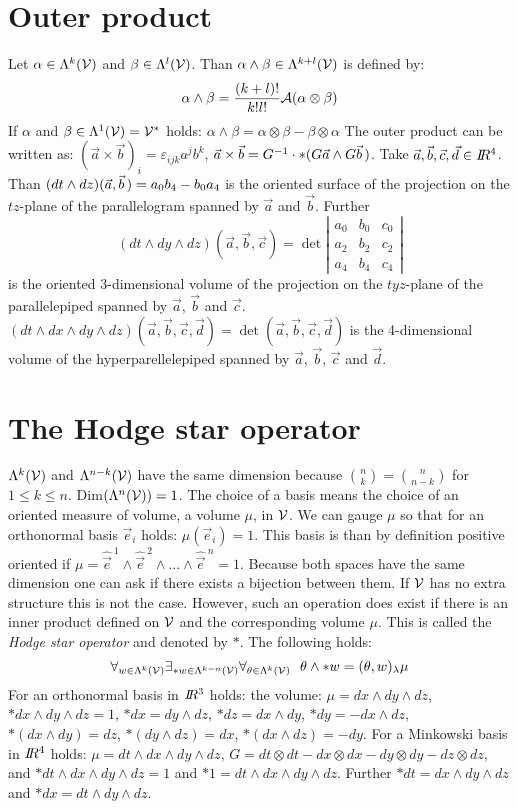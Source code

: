 \documentclass[a4paper,fancyheadings,twoside]{report}
\begin{document}
\section{Outer product}
Let $\alpha\in\Lambda^k(\cal V)$ and $\beta\in\Lambda^l(\cal V)$. Than
$\alpha\wedge\beta\in\Lambda^{k+l}(\cal V)$ is defined by:
\[
\alpha\wedge\beta=\frac{(k+l)!}{k!l!}{\cal A}(\alpha\otimes\beta)
\]
If $\alpha$ and $\beta\in\Lambda^1(\cal V)={\cal V}^*$ holds:
$\alpha\wedge\beta=\alpha\otimes\beta-\beta\otimes\alpha$
\npar
The outer product can be written as: $(\vec{a}\times\vec{b})_i=\varepsilon_{ijk}a^jb^k$,
$\vec{a}\times\vec{b}=G^{-1}\cdot*(G\vec{a}\wedge G\vec{b}\,)$.
\npar
Take $\vec{a},\vec{b},\vec{c},\vec{d}\in I\hspace{-1mm}R^4$. Than
$(dt\wedge dz)(\vec{a},\vec{b}\,)=a_0b_4-b_0a_4$ is the oriented surface of the
projection on the $tz$-plane of the parallelogram spanned by $\vec{a}$ and
$\vec{b}$.
\npar
Further
\[
(dt\wedge dy\wedge dz)(\vec{a},\vec{b},\vec{c})=\det\left|\begin{array}{ccc}
a_0&b_0&c_0\\ a_2&b_2&c_2\\ a_4&b_4&c_4 \end{array}\right|
\]
is the oriented 3-dimensional volume of the projection on the $tyz$-plane of
the parallelepiped spanned by $\vec{a}$, $\vec{b}$ and $\vec{c}$.
\npar
$(dt\wedge dx\wedge dy\wedge dz)(\vec{a},\vec{b},\vec{c},\vec{d})=\det(\vec{a},\vec{b},\vec{c},\vec{d})$
is the 4-dimensional volume of the hyperparellelepiped spanned by
$\vec{a}$, $\vec{b}$, $\vec{c}$ and $\vec{d}$.

\section{The Hodge star operator}
$\Lambda^k(\cal V)$ and $\Lambda^{n-k}(\cal V)$ have the same dimension
because ${n\choose k}={n\choose{n-k}}$ for $1\leq k\leq n$.
Dim$(\Lambda^n({\cal V}))=1$. The choice of a basis means the choice of an oriented
measure of volume, a volume $\mu$, in $\cal V$. We can gauge $\mu$ so that for
an orthonormal basis $\vec{e}_i$ holds: $\mu(\vec{e}_i)=1$. This basis is than
by definition positive oriented if
$\mu=\hat{\vec{e}}^{~1}\wedge \hat{\vec{e}}^{~2}\wedge...\wedge \hat{\vec{e}}^{~n}=1$.
\npar
Because both spaces have the same dimension one can ask if there exists a
bijection between them. If $\cal V$ has no extra structure this is not the
case. However, such an operation does exist if there is an inner product
defined on $\cal V$ and the corresponding volume $\mu$. This is called
the {\it Hodge star operator} and denoted by $*$. The following holds:
\[
\forall_{w\in\Lambda^k({\cal V})}\exists_{*w\in\Lambda^{k-n}({\cal V})}\forall_{\theta\in\Lambda^k({\cal V})}~~
\theta\wedge*w=(\theta,w)_\lambda\mu
\]
For an orthonormal basis in $I\hspace{-1mm}R^3$ holds: the volume: $\mu=dx\wedge dy\wedge dz$,
$*dx\wedge dy\wedge dz=1$, $*dx=dy\wedge dz$, $*dz=dx\wedge dy$, $*dy=-dx\wedge dz$,
$*(dx\wedge dy)=dz$, $*(dy\wedge dz)=dx$, $*(dx\wedge dz)=-dy$.
\npar
For a Minkowski basis in $I\hspace{-1mm}R^4$ holds: $\mu=dt\wedge dx\wedge dy\wedge dz$,
$G=dt\otimes dt-dx\otimes dx-dy\otimes dy-dz\otimes dz$, and
$*dt\wedge dx\wedge dy\wedge dz=1$ and $*1=dt\wedge dx\wedge dy\wedge dz$.
Further $*dt=dx\wedge dy\wedge dz$ and $*dx=dt\wedge dy\wedge dz$.
\end{document}
